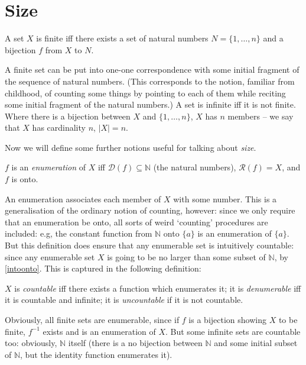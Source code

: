 \section{Size}

\begin{definition}[Finite]
  A set $X$ is finite iff there exists a set of natural numbers $N = \{1,\ldots,n\}$ and a bijection $f$ from $X$ to $N$.
\end{definition} A finite set can be put into one-one correspondence with some initial fragment of the sequence of natural numbers. (This corresponds to the notion, familiar from childhood, of counting some things by pointing to each of them while reciting some initial fragment of the natural numbers.) A set is infinite iff it is not finite. Where there is a bijection between $X$ and $\{1,\ldots,n\}$, $X$ has $n$ members – we say that $X$ has cardinality $n$, $|X|=n$.

Now we will define some further notions useful for talking about \emph{size}.
\begin{definition}[Enumeration] $f$ is an \emph{enumeration} of $X$ iff $\mathcal{D}(f) \subseteq \mathbb{N}$ (the natural numbers), $\mathcal{R}(f) = X$, and $f$ is onto.
\end{definition} An enumeration associates each member of $X$ with some number. This is a generalisation of the ordinary notion of counting, however: since we only require that an enumeration be onto, all sorts of weird `counting' procedures are included: e.g, the constant function from $\mathbb{N}$ onto $\{a\}$ is an enumeration of $\{a\}$. But this definition does ensure that any enumerable set is intuitively countable: since any enumerable set $X$ is going to be no larger than some subset of $\mathbb{N}$, by \autoref{intoonto}. This is captured in the following definition: 
\begin{definition}[{[Un]}Countable] $X$ is \emph{countable} iff there exists a function which enumerates it; it is \emph{denumerable} iff it is countable and infinite; it is \emph{uncountable} if it is not countable.
\end{definition}
Obviously, all finite sets are enumerable, since if $f$ is a bijection showing $X$ to be finite, $f^{-1}$ exists and is an enumeration of $X$. But some infinite sets are countable too: obviously, $\mathbb{N}$ itself (there is a no bijection between $\mathbb{N}$ and some initial subset of $\mathbb{N}$, but the identity function enumerates it).

